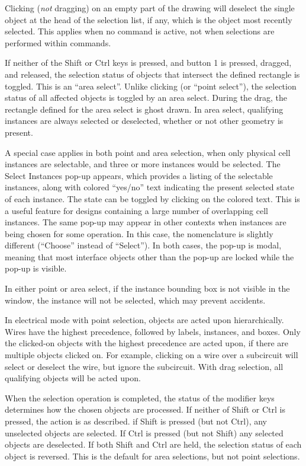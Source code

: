 Clicking ({\it not} dragging) on an empty part of the drawing will
deselect the single object at the head of the selection list, if any,
which is the object most recently selected.  This applies when no
command is active, not when selections are performed within commands.

If neither of the {\kb Shift} or {\kb Ctrl} keys is pressed, and
button 1 is pressed, dragged, and released, the selection status of
objects that intersect the defined rectangle is toggled.  This is an
``area select''.  Unlike clicking (or ``point select''), the selection
status of all affected objects is toggled by an area select.  During
the drag, the rectangle defined for the area select is ghost drawn. 
In area select, qualifying instances are always selected or
deselected, whether or not other geometry is present.

A special case applies in both point and area selection, when only
physical cell instances are selectable, and three or more instances
would be selected.  The {\cb Select Instances} pop-up appears, which
provides a listing of the selectable instances, along with colored
``yes/no'' text indicating the present selected state of each
instance.  The state can be toggled by clicking on the colored text. 
This is a useful feature for designs containing a large number of
overlapping cell instances.  The same pop-up may appear in other
contexts when instances are being chosen for some operation.  In this
case, the nomenclature is slightly different (``Choose'' instead of
``Select'').  In both cases, the pop-up is modal, meaning that most
interface objects other than the pop-up are locked while the pop-up is
visible.

In either point or area select, if the instance bounding box is not
visible in the window, the instance will not be selected, which may
prevent accidents.

In electrical mode with point selection, objects are acted upon
hierarchically.  Wires have the highest precedence, followed by
labels, instances, and boxes.  Only the clicked-on objects with the
highest precedence are acted upon, if there are multiple objects
clicked on.  For example, clicking on a wire over a subcircuit will
select or deselect the wire, but ignore the subcircuit.  With drag
selection, all qualifying objects will be acted upon.

When the selection operation is completed, the status of the modifier
keys determines how the chosen objects are processed.  If neither of
{\kb Shift} or {\kb Ctrl} is pressed, the action is as described.  if
{\kb Shift} is pressed (but not {\kb Ctrl}), any unselected objects
are selected.  If {\kb Ctrl} is pressed (but not {\kb Shift}) any
selected objects are deselected.  If both {\kb Shift} and {\kb Ctrl}
are held, the selection status of each object is reversed.  This is
the default for area selections, but not point selections.

